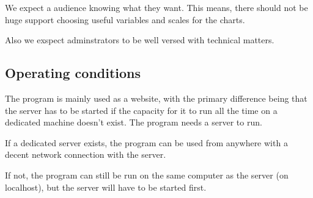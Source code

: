 %   
%   


We expect a audience knowing what they want. This means,
there should not be huge support choosing useful variables and scales for
the charts. 

Also we exspect adminstrators to be well versed with technical matters.

% 
 

\subsection{Operating conditions}

The program is mainly used as a website, with the primary difference being
 that the server has to be started if the capacity for it to run 
 all the time on a dedicated machine doesn't exist. 
The program needs a server to run. 

If a dedicated server exists, the program can be used from anywhere
 with a decent network connection with the server.

If not, the program can still be run on the same computer as 
the server (on localhost), but the server will have to be started first.
 

